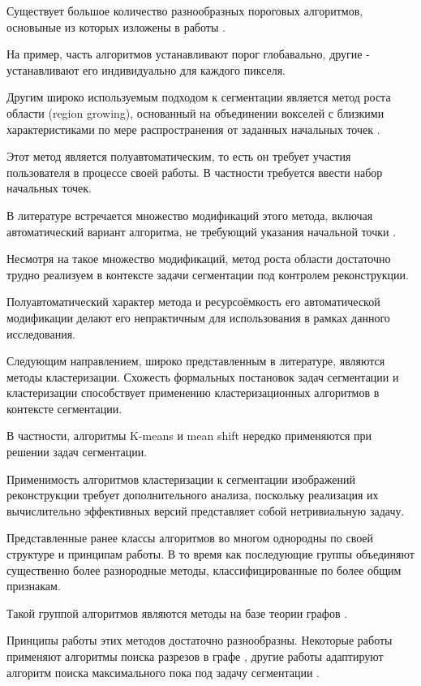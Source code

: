 Существует большое количество разнообразных пороговых алгоритмов, основыные из которых изложены в работы \cite{wirjadi2007survey}. 

На пример, часть алгоритмов устанавливают порог глобавально, другие - устанавливают его индивидуально для каждого пикселя. 

Другим широко используемым подходом к сегментации является метод роста области (region growing), основанный на объединении вокселей с близкими характеристиками по мере распространения от заданных начальных точек \cite{adams1994seeded}.

Этот метод является полуавтоматическим, то есть он требует участия пользователя в процессе своей работы. В частности требуется ввести набор начальных точек.

В литературе встречается множество модификаций этого метода, включая автоматический вариант алгоритма, не требующий указания начальной точки \cite{lin2000unseeded}. 

Несмотря на такое множество модификаций, метод роста области достаточно трудно реализуем в контексте задачи сегментации под контролем реконструкции.

Полуавтоматический характер метода и ресурсоёмкость его автоматической модификации делают его непрактичным для использования в рамках данного исследования.

Следующим направлением, широко представленным в литературе, являются методы кластеризации. Схожесть формальных постановок задач сегментации и кластеризации способствует применению кластеризационных алгоритмов в контексте сегментации.

В частности, алгоритмы K-means \cite{sarker2017segmentation} и mean shift \cite{comaniciu2002mean} нередко применяются при решении задач сегментации.

Применимость алгоритмов кластеризации к сегментации изображений реконструкции требует дополнительного анализа, поскольку реализация их вычислительно эффективных версий представляет собой нетривиальную задачу.

Представленные ранее классы алгоритмов во многом однородны по своей структуре и принципам работы. В то время как последующие группы объединяют существенно более разнородные методы, классифицированные по более общим признакам.

Такой группой алгоритмов являются методы на базе теории графов \cite{camilus2012review}. 

Принципы работы этих методов достаточно разнообразны. Некоторые работы применяют алгоритмы поиска разрезов в графе \cite{boykov2003computing, peng2019interactive}, другие работы адаптируют алгоритм поиска максимального пока под задачу сегментации \cite{zeng2008topology}.

